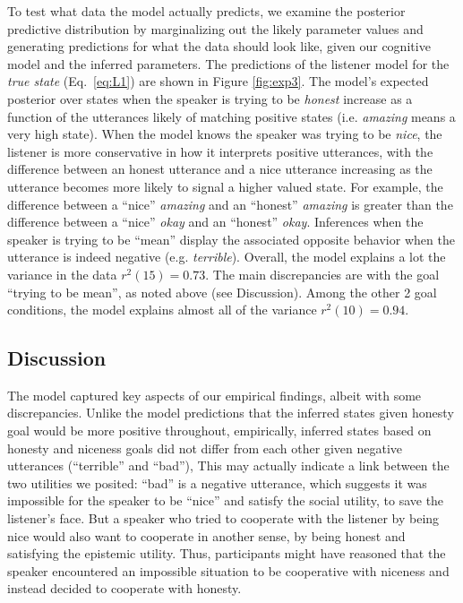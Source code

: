 \documentclass[10pt,letterpaper]{article}
\newcommand{\mht}[1]{\textcolor{DarkOrange}{[mht: #1]}}
\begin{document}
To test what data the model actually predicts, we examine the posterior predictive distribution by marginalizing out the likely parameter values and generating predictions for what the data should look like, given our cognitive model and the inferred parameters.
The predictions of the listener model for the \emph{true state} (Eq.~\ref{eq:L1}) are shown in Figure \ref{fig:exp3}.
The model's expected posterior over states when the speaker is trying to be \emph{honest} increase as a function of the utterances likely of matching positive states (i.e. \emph{amazing} means a very high state).
When the model knows the speaker was trying to be \emph{nice}, the listener is more conservative in how it interprets positive utterances, with the difference between an honest utterance and a nice utterance increasing as the utterance becomes more likely to signal a higher valued state. 
For example, the difference between a ``nice'' \emph{amazing} and an ``honest'' \emph{amazing} is greater than the difference between a ``nice'' \emph{okay} and an ``honest'' \emph{okay}.
Inferences when the speaker is trying to be ``mean'' display the associated opposite behavior when the utterance is indeed negative (e.g. \emph{terrible}).
Overall, the model explains a lot the variance in the data $r^2(15) = 0.73$. 
The main discrepancies are with the goal ``trying to be mean'', as noted above (see Discussion). 
Among the other 2 goal conditions, the model explains almost all of the variance $r^2(10) = 0.94$. 

\subsection{Discussion}



The model captured key aspects of our empirical findings, albeit with some discrepancies.
Unlike the model predictions that the inferred states given honesty goal would be more positive throughout,
empirically, inferred states based on honesty and niceness goals did not differ from each other given negative utterances (``terrible'' and ``bad''), 
This may actually indicate a link between the two utilities we posited: 
``bad'' is a negative utterance, which suggests it was impossible for the speaker to be ``nice'' and satisfy the social utility, to save the listener's face. 
But a speaker who tried to cooperate with the listener by being nice would also want to cooperate in another sense, by being honest and satisfying the epistemic utility.  
Thus, participants might have reasoned that the speaker encountered an impossible situation to be cooperative with niceness and instead decided to cooperate with honesty. 
\end{document}

